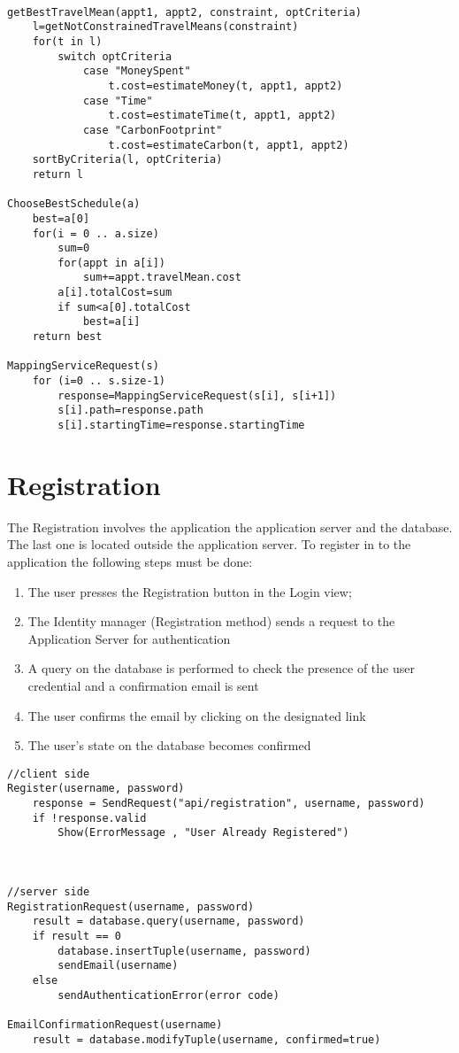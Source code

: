 \begin{lstlisting}
					
getBestTravelMean(appt1, appt2, constraint, optCriteria)
	l=getNotConstrainedTravelMeans(constraint)
	for(t in l)
		switch optCriteria
			case "MoneySpent"
				t.cost=estimateMoney(t, appt1, appt2)
			case "Time"
				t.cost=estimateTime(t, appt1, appt2)
			case "CarbonFootprint"
				t.cost=estimateCarbon(t, appt1, appt2)
	sortByCriteria(l, optCriteria)
	return l
	
ChooseBestSchedule(a)
	best=a[0]
	for(i = 0 .. a.size)
		sum=0
		for(appt in a[i])
			sum+=appt.travelMean.cost
		a[i].totalCost=sum
		if sum<a[0].totalCost
			best=a[i]
	return best
	
MappingServiceRequest(s)
	for (i=0 .. s.size-1)
		response=MappingServiceRequest(s[i], s[i+1])
		s[i].path=response.path
		s[i].startingTime=response.startingTime

\end{lstlisting}

\section{Registration}
The Registration involves the application the application server and the database. The last one is located outside the application server. 
To register in to the application the following steps must be done:
\begin{enumerate}
\item The user presses the Registration button in the Login view;
\item The Identity manager (Registration method) sends a request to the Application Server for authentication
\item A query on the database is performed to check the presence of the user credential and a confirmation email is sent
\item The user confirms the email by clicking on the designated link
\item The user's state on the database becomes confirmed
\end{enumerate}

\begin{lstlisting}
//client side
Register(username, password)
	response = SendRequest("api/registration", username, password)
	if !response.valid
		Show(ErrorMessage , "User Already Registered")
		

	
//server side
RegistrationRequest(username, password)
	result = database.query(username, password)
	if result == 0
		database.insertTuple(username, password)
		sendEmail(username)
	else
		sendAuthenticationError(error code)
		
EmailConfirmationRequest(username)
	result = database.modifyTuple(username, confirmed=true)
\end{lstlisting}


